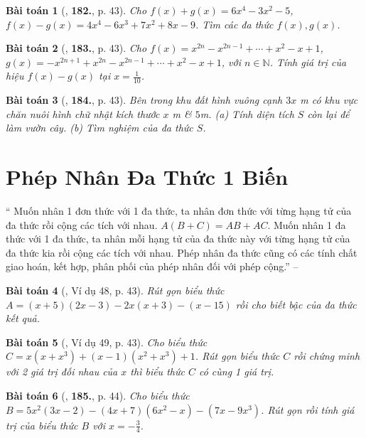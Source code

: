 \documentclass{article}
\numberwithin{equation}{section}
\newtheorem{baitoan}{Bài toán}
\begin{document}
\begin{baitoan}[\cite{Tuyen_Toan_7}, \textbf{182.}, p. 43]
	Cho $f(x) + g(x) = 6x^4 - 3x^2 - 5$, $f(x) - g(x) = 4x^4 - 6x^3 + 7x^2 + 8x - 9$. Tìm các đa thức $f(x),g(x)$.
\end{baitoan}

\begin{baitoan}[\cite{Tuyen_Toan_7}, \textbf{183.}, p. 43]
	Cho $f(x) = x^{2n} - x^{2n-1} + \cdots + x^2 - x + 1$, $g(x) = -x^{2n+1} + x^{2n} - x^{2n-1} + \cdots + x^2 - x + 1$, với $n\in\mathbb{N}$. Tính giá trị của hiệu $f(x) - g(x)$ tại $x = \frac{1}{10}$.
\end{baitoan}

\begin{baitoan}[\cite{Tuyen_Toan_7}, \textbf{184.}, p. 43]
	Bên trong khu đất hình vuông cạnh $3x$ \emph{m} có khu vực chăn nuôi hình chữ nhật kích thước $x$ \emph{m} \& $5$\emph{m}. (a) Tính diện tích $S$ còn lại để làm vườn cây. (b) Tìm nghiệm của đa thức $S$.
\end{baitoan}


\section{Phép Nhân Đa Thức 1 Biến}
`` Muốn nhân 1 đơn thức với 1 đa thức, ta nhân đơn thức với từng hạng tử của đa thức rồi cộng các tích với nhau. $A(B + C) = AB + AC$.  Muốn nhân 1 đa thức với 1 đa thức, ta nhân mỗi hạng tử của đa thức này với từng hạng tử của đa thức kia rồi cộng các tích với nhau.  Phép nhân đa thức cũng có các tính chất giao hoán, kết hợp, phân phối của phép nhân đối với phép cộng.'' -- \cite[Chap. III, \S4, p. 43]{Tuyen_Toan_7}

\begin{baitoan}[\cite{Tuyen_Toan_7}, Ví dụ 48, p. 43]
	Rút gọn biểu thức $A =  (x + 5)(2x - 3) - 2x(x + 3) - (x - 15)$ rồi cho biết bậc của đa thức kết quả.
\end{baitoan}

\begin{baitoan}[\cite{Tuyen_Toan_7}, Ví dụ 49, p. 43]
	Cho biểu thức $C = x(x + x^3) + (x - 1)(x^2 + x^3) + 1$. Rút gọn biểu thức $C$ rồi chứng minh với 2 giá trị đối nhau của $x$ thì biểu thức $C$ có cùng 1 giá trị.
\end{baitoan}

\begin{baitoan}[\cite{Tuyen_Toan_7}, \textbf{185.}, p. 44]
	Cho biểu thức $B = 5x^2(3x - 2) - (4x + 7)(6x^2 - x) - (7x - 9x^3)$. Rút gọn rồi  tính giá trị của biểu thức $B$ với $x = -\frac{3}{4}$.
\end{baitoan}
\end{document}
